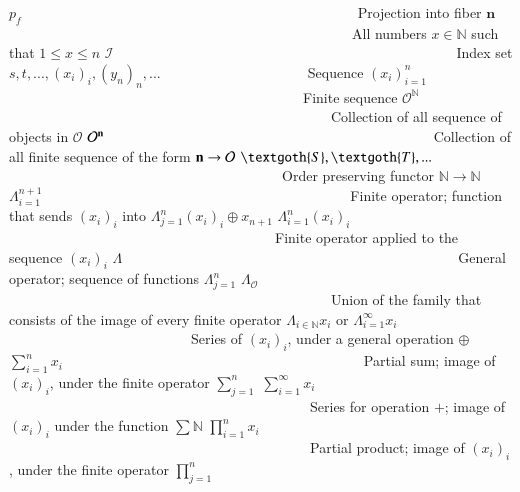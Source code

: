 \documentclass [12pt]{book}
\begin{document}
$p_f$~~~~~~~~~~~~~~~~~~~~~~~~~~~~~~~~~~~~~~~~~~~~~~~~Projection into fiber\newline
$\textbf{n}$~~~~~~~~~~~~~~~~~~~~~~~~~~~~~~~~~~~~~~~~~~~~~~~~~All numbers $x\in\mathbb N$ such that $1\leq x\leq n$\newline
$\mathcal I$~~~~~~~~~~~~~~~~~~~~~~~~~~~~~~~~~~~~~~~~~~~~~~~~~Index set\newline
$s,t,...,(x_i)_i,(y_n)_n,...$~~~~~~~~~~~~~~~~~~~~~Sequence\newline
$(x_i)_{i=1}^n$~~~~~~~~~~~~~~~~~~~~~~~~~~~~~~~~~~~~~~~~~~Finite sequence\newline
$\mathcal O^{\mathbb N}$~~~~~~~~~~~~~~~~~~~~~~~~~~~~~~~~~~~~~~~~~~~~~~Collection of all sequence of objects in $\mathcal O$\newline
$\mathcal O^{\textbf n}$~~~~~~~~~~~~~~~~~~~~~~~~~~~~~~~~~~~~~~~~~~~~~~~Collection of all finite  sequence of the form $\textbf n\rightarrow\mathcal O$\newline
$\textgoth{S},\textgoth{T},...$~~~~~~~~~~~~~~~~~~~~~~~~~~~~~~~~~~~~~~~Order preserving functor $\mathbb N\rightarrow\mathbb N$\newline
$\Lambda_{i=1}^{n+1}$~~~~~~~~~~~~~~~~~~~~~~~~~~~~~~~~~~~~~~~~~~~~Finite operator; function that sends $(x_i)_i$ into $\Lambda_{j=1}^n(x_i)_i\oplus x_{n+1}$\newline
$\Lambda_{i=1}^{n}(x_i)_i$~~~~~~~~~~~~~~~~~~~~~~~~~~~~~~~~~~~~~~Finite operator applied to the sequence $(x_i)_i$\newline
$\Lambda$~~~~~~~~~~~~~~~~~~~~~~~~~~~~~~~~~~~~~~~~~~~~~~~~General operator; sequence of functions $\Lambda_{j=1}^n$\newline
$\Lambda_\mathcal O$~~~~~~~~~~~~~~~~~~~~~~~~~~~~~~~~~~~~~~~~~~~~~~Union of the family that consists of the image of every finite operator\newline
$\Lambda_{i\in\mathbb N}x_i$ or $\Lambda_{i=1}^\infty x_i$~~~~~~~~~~~~~~~~~~~~~~~~~~Series of $(x_i)_i$, under a general operation $\oplus$\newline
$\sum\limits_{i=1}^nx_i$~~~~~~~~~~~~~~~~~~~~~~~~~~~~~~~~~~~~~~~~~~~Partial sum; image of $(x_i)_i$, under the finite operator $\sum_{j=1}^n$\newline
$\sum\limits_{i=1}^\infty x_i$~~~~~~~~~~~~~~~~~~~~~~~~~~~~~~~~~~~~~~~~~~~Series for operation $+$; image of $(x_i)_i$ under the function $\sum\mathbb N$\newline
$\prod\limits_{i=1}^nx_i$~~~~~~~~~~~~~~~~~~~~~~~~~~~~~~~~~~~~~~~~~~~Partial product; image of $(x_i)_i$, under the finite operator $\prod_{j=1}^n$\newline
\end{document}
